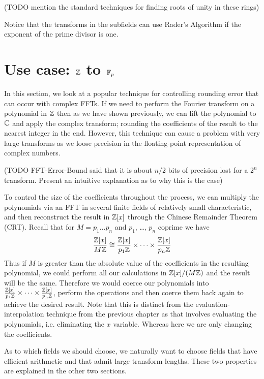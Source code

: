 (TODO mention the standard techniques for finding roots of unity in these rings)

Notice that the transforms in the subfields can use Rader's Algorithm if the exponent of the prime divisor is one.


\section{Use case: ${\mathbb Z}$ to ${\mathbb F}_p$}\label{sec:Z-Fp}

In this section, we look at a popular technique for controlling rounding error that can occur with complex FFTs. If we need to perform the Fourier transform on a polynomial in ${\mathbb Z}$ then as we have shown previously, we can lift the polynomial to ${\mathbb C}$ and apply the complex transform; rounding the coefficients of the result to the nearest integer in the end. However, this technique can cause a problem with very large transforms as we loose precision in the floating-point representation of complex numbers.

\medskip

(TODO FFT-Error-Bound said that it is about $n / 2$ bits of precision lost for a $2^n$ transform. Present an intuitive explanation as to why this is the case)

\medskip

To control the size of the coefficients throughout the process, we can multiply the polynomials via an FFT in several finite fields of relatively small characteristic, and then reconstruct the result in ${\mathbb Z}[x]$ through the Chinese Remainder Theorem (CRT). Recall that for $M = p_1\ldots p_n$ and $p_1$, \ldots, $p_n$ coprime we have
\[
    \frac{{\mathbb Z}[x]}{M{\mathbb Z}} \cong \frac{{\mathbb Z}[x]}{p_1{\mathbb Z}} \times \cdots \times \frac{{\mathbb Z}[x]}{p_n{\mathbb Z}}
\]
Thus if $M$ is greater than the absolute value of the coefficients in the resulting polynomial, we could perform all our calculations in ${\mathbb Z}[x]/(M {\mathbb Z})$ and the result will be the same. Therefore we would coerce our polynomials into $\frac{{\mathbb Z}[x]}{p_1{\mathbb Z}} \times \cdots \times \frac{{\mathbb Z}[x]}{p_n{\mathbb Z}}$, perform the operations and then coerce them back again to achieve the desired result. Note that this is distinct from the evaluation-interpolation technique from the previous chapter as that involves evaluating the polynomials, i.e. eliminating the $x$ variable. Whereas here we are only changing the coefficients.

As to which fields we should choose, we naturally want to choose fields that have efficient arithmetic and that admit large transform lengths. These two properties are explained in the other two sections.

